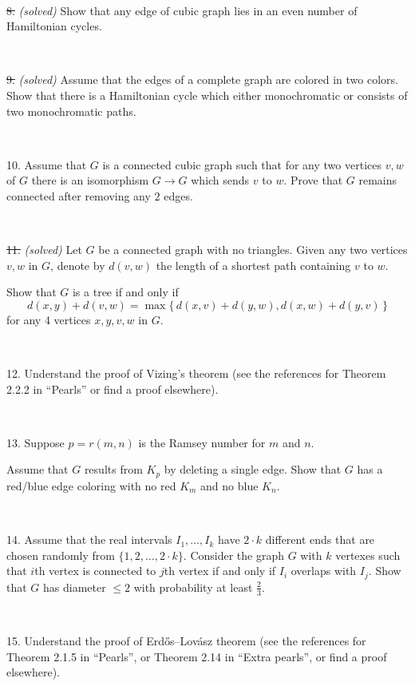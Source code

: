 \documentclass[oneside,a4paper]{article}
\begin{document}
\ 

\noindent %
\sout{8.} \textit{(solved)}
Show that any edge of cubic graph lies in an even number of Hamiltonian cycles.


\ 

\noindent 
\sout{9.} \textit{(solved)}
Assume that the edges of a complete graph are colored in two colors.
Show that there is a Hamiltonian cycle which either monochromatic or consists of two monochromatic paths.

\ 

\noindent %
{10.}  %
Assume that $G$ is a connected cubic graph such that 
for any two vertices $v,w$ of $G$ there is an isomorphism
$G\to G$ which sends $v$ to $w$.
Prove that $G$ remains connected after removing any $2$ edges.

\ 


\noindent \sout
{11.} \textit{(solved)}
Let $G$ be a connected graph with no triangles.
Given any two vertices $v,w$ in $G$, denote by $d(v,w)$ the length of a shortest path containing $v$ to $w$. 

Show that $G$ is a tree if and only if
\[d(x,y)+d(v,w)=\max\{\,d(x,v)+d(y,w),d(x,w)+d(y,v)\,\}\]
for any 4 vertices $x,y,v,w$ in $G$.

\ 

\noindent %
{12.} %
Understand the proof of Vizing's theorem (see the references for Theorem 2.2.2 in ``Pearls'' or find a proof elsewhere).

\ 

\noindent %
{13.} %
Suppose $p=r(m,n)$ is the Ramsey number for $m$ and $n$.%


Assume that $G$ results from $K_p$ by deleting a single edge.
Show that $G$ has a red/blue edge coloring with no red
$K_m$ and no blue $K_n$.


\ 

\noindent %
{14.} %
Assume that the real intervals $I_1,\dots,I_k$ have $2{\cdot}k$ different ends that are chosen randomly from $\{1,2,\dots,2{\cdot} k\}$.
Consider the graph $G$ with $k$ vertexes such that $i$th vertex is connected to $j$th vertex if and only if $I_i$ overlaps with $I_j$.
Show that $G$ has diameter $\le 2$ with probability at least $\tfrac23$.

\ 

\noindent %
{15.} 
Understand the proof of Erd\H{o}s--Lov\'{a}sz theorem (see the references for Theorem 2.1.5 in ``Pearls'', or Theorem 2.14 in ``Extra pearls'', or find a proof elsewhere).
\end{document}
